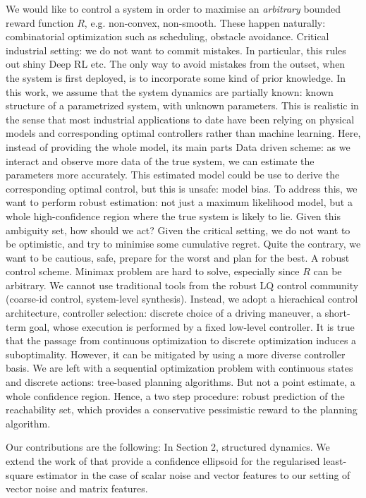\documentclass{article}
\begin{document}
We would like to control a system in order to maximise an \textit{arbitrary} bounded reward function $R$, e.g. non-convex, non-smooth. These happen naturally: combinatorial optimization such as scheduling, obstacle avoidance.
Critical industrial setting: we do not want to commit mistakes. 
In particular, this rules out shiny Deep RL etc.
The only way to avoid mistakes from the outset, when the system is first deployed, is to incorporate some kind of prior knowledge. In this work, we assume that the system dynamics are partially known: known structure of a parametrized system, with unknown parameters. This is realistic in the sense that most industrial applications to date have been relying on physical models and corresponding optimal controllers rather than machine learning. Here, instead of providing the whole model, its main parts  
Data driven scheme: as we interact and observe more data of the true system, we can estimate the parameters more accurately.
This estimated model could be use to derive the corresponding optimal control, but this is unsafe: model bias.
To address this, we want to perform robust estimation: not just a maximum likelihood model, but a whole high-confidence region where the true system is likely to lie.
Given this ambiguity set, how should we act? Given the critical setting, we do not want to be optimistic, and try to minimise some cumulative regret. Quite the contrary, we want to be cautious, safe, prepare for the worst and plan for the best. A robust control scheme. Minimax problem are hard to solve, especially since $R$ can be arbitrary. We cannot use traditional tools from the robust LQ control community (coarse-id control, system-level synthesis). Instead, we adopt a hierachical control architecture, controller selection: discrete choice of a driving maneuver, a short-term goal, whose execution is performed by a fixed low-level controller. It is true that the passage from continuous optimization to discrete optimization induces a suboptimality. However, it can be mitigated by using a more diverse controller basis. We are left with a sequential optimization problem with continuous states and discrete actions: tree-based planning algorithms. But not a point estimate, a whole confidence region. Hence, a two step procedure: robust prediction of the reachability set, which provides a conservative pessimistic reward to the planning algorithm.

Our contributions are the following:
In Section 2, structured dynamics. We extend the work of \citet{Abbasi2011} that provide a confidence ellipsoid for the regularised least-square estimator in the case of scalar noise and vector features to our setting of vector noise and matrix features.
\end{document}
